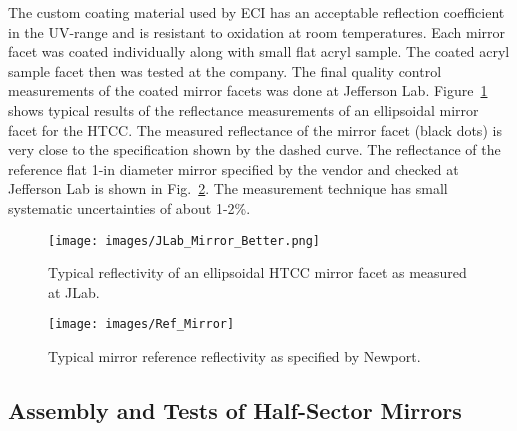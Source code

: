 The custom coating material used by ECI has an acceptable reflection coefficient in the UV-range and is
resistant to oxidation at room temperatures. Each mirror facet was coated individually along with small flat
acryl sample. The coated acryl sample facet then was tested at the company. The final quality control
measurements of the coated mirror facets was done at Jefferson Lab. Figure~\ref{fig:JLab_Mirror_Better}
shows typical results of the reflectance  measurements of an ellipsoidal mirror facet for the HTCC. The
measured reflectance of the mirror facet (black dots) is very close to the specification shown by the dashed
curve. The reflectance of the reference flat 1-in diameter mirror specified by the vendor and checked at
Jefferson Lab is shown in Fig.~\ref{fig:Ref_Mirror}. The measurement technique has small systematic
uncertainties of about 1-2\%.

\begin{figure}[ht]
    \centering
    \texttt{[image: images/JLab\_Mirror\_Better.png]}
    \caption{Typical reflectivity of an ellipsoidal HTCC mirror facet as measured at JLab.}
    \label{fig:JLab_Mirror_Better}
\end{figure}

\begin{figure}[ht]
    \centering
    \texttt{[image: images/Ref\_Mirror]}
    \caption{Typical mirror reference reflectivity  as specified by Newport.}
    \label{fig:Ref_Mirror}
\end{figure}
 
\subsection{Assembly and Tests of Half-Sector Mirrors}

